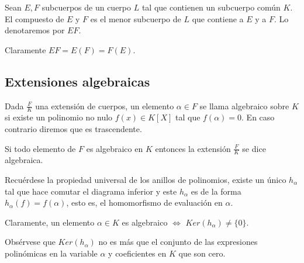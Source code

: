 \begin{definition}
	Sean $E,F$ subcuerpos de un cuerpo $L$ tal que contienen un subcuerpo común $K$. El compuesto de $E$ y $F$ es el menor subcuerpo de $L$ que contiene a $E$ y a $F$. Lo denotaremos por $EF$. 
	
	Claramente $EF = E(F) = F(E)$. 
\end{definition}


\subsection{Extensiones algebraicas}

\begin{definition}
Dada $\frac{F}{K}$ una extensión de cuerpos, un elemento $\alpha \in F$ se llama algebraico sobre $K$ si existe un polinomio no nulo $f(x) \in K[X]$ tal que $f(\alpha) = 0$. En caso contrario diremos que es trascendente. 

Si todo elemento de $F$ es algebraico en $K$ entonces la extensión $\frac{F}{K}$ se dice algebraica. 
\end{definition}

Recuérdese la propiedad universal de los anillos de polinomios, existe un único $h_\alpha$ tal que hace comutar el diagrama inferior y este $h_\alpha$ es de la forma $h_\alpha(f) = f(\alpha)$, esto es, el homomorfismo de evaluación en $\alpha$. 


Claramente, un elemento $\alpha \in K$ es algebraico $\iff$ $Ker(h_\alpha) \neq \{0\}$. 

Obsérvese que $Ker(h_\alpha)$ no es más que el conjunto de las expresiones polinómicas en la variable $\alpha$ y coeficientes en $K$ que son cero. 

